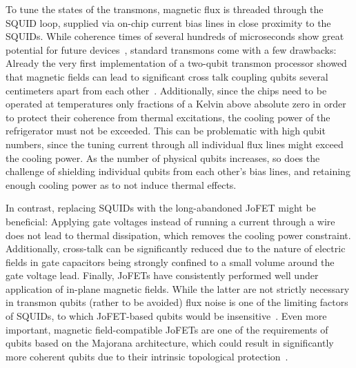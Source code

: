 To tune the states of the transmons, magnetic flux is threaded through the SQUID loop, supplied via on-chip current bias lines in close proximity to the SQUIDs.
%
While coherence times of several hundreds of microseconds show great potential for future devices~\cite{placeNewMaterialPlatform2020}, standard transmons come with a few drawbacks:
%
Already the very first implementation of a two-qubit transmon processor showed that magnetic fields can lead to significant cross talk coupling qubits several centimeters apart from each other~\cite{dicarloDemonstrationTwoqubitAlgorithms2009}.
%
Additionally, since the chips need to be operated at temperatures only fractions of a Kelvin above absolute zero in order to protect their coherence from thermal excitations, the cooling power of the refrigerator must not be exceeded.
%
This can be problematic with high qubit numbers, since the tuning current through all individual flux lines might exceed the cooling power.
%
As the number of physical qubits increases, so does the challenge of shielding individual qubits from each other's bias lines, and retaining enough cooling power as to not induce thermal effects.

In contrast, replacing SQUIDs with the long-abandoned JoFET might be beneficial:
%
Applying gate voltages instead of running a current through a wire does not lead to thermal dissipation, which removes the cooling power constraint.
%
Additionally, cross-talk can be significantly reduced due to the nature of electric fields in gate capacitors being strongly confined to a small volume around the gate voltage lead.
%
Finally, JoFETs have consistently performed well under application of in-plane magnetic fields.
%
While the latter are not strictly necessary in transmon qubits (rather to be avoided) flux noise is one of the limiting factors of SQUIDs, to which JoFET-based qubits would be insensitive~\cite{casparisSuperconductingGatemonQubit2018}.
%
Even more important, magnetic field-compatible JoFETs are one of the requirements of qubits based on the Majorana architecture, which could result in significantly more coherent qubits due to their intrinsic topological protection~\cite{hyartFluxcontrolledQuantumComputation2013}.


